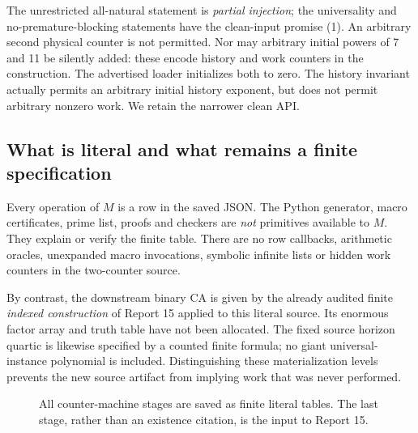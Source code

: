\documentclass[11pt,a4paper]{article}
\numberwithin{equation}{section}
\begin{document}
The unrestricted all-natural statement is \emph{partial injection}; the
universality and no-premature-blocking statements have the clean-input promise
(1). An arbitrary second physical counter is not permitted. Nor may arbitrary
initial powers of 7 and 11 be silently added: these encode history and work
counters in the construction. The advertised loader initializes both to zero.
The history invariant actually permits an arbitrary initial history exponent,
but does not permit arbitrary nonzero work. We retain the narrower clean API.

\subsection{What is literal and what remains a finite specification}
Every operation of $M$ is a row in the saved JSON. The Python generator,
macro certificates, prime list, proofs and checkers are \emph{not} primitives
available to $M$. They explain or verify the finite table. There are no row
callbacks, arithmetic oracles, unexpanded macro invocations, symbolic infinite
lists or hidden work counters in the two-counter source.

By contrast, the downstream binary CA is given by the already audited finite
\emph{indexed construction} of Report 15 applied to this literal source.
Its enormous factor array and truth table have not been allocated. The fixed
source horizon quartic is likewise specified by a counted finite formula;
no giant universal-instance polynomial is included. Distinguishing these
materialization levels prevents the new source artifact from implying work
that was never performed.

\begin{figure}[ht]
\centering
{}
\caption{All counter-machine stages are saved as finite literal tables. The
last stage, rather than an existence citation, is the input to Report 15.}
\label{fpa:ls:fig:pipeline}
\end{figure}
\end{document}
